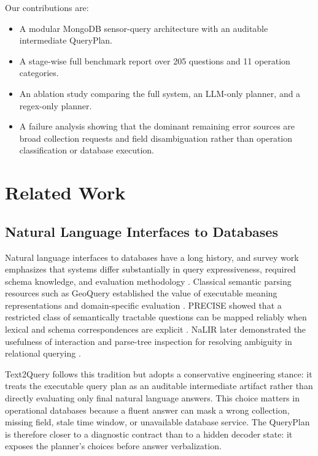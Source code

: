 \documentclass[11pt]{article}
\begin{document}
Our contributions are:
\begin{itemize}
\item A modular MongoDB sensor-query architecture with an auditable intermediate QueryPlan.
\item A stage-wise full benchmark report over 205 questions and 11 operation categories.
\item An ablation study comparing the full system, an LLM-only planner, and a regex-only planner.
\item A failure analysis showing that the dominant remaining error sources are broad collection requests and field disambiguation rather than operation classification or database execution.
\end{itemize}

\section{Related Work}

\subsection{Natural Language Interfaces to Databases}

Natural language interfaces to databases have a long history, and survey work emphasizes that systems differ substantially in query expressiveness, required schema knowledge, and evaluation methodology \cite{androutsopoulos1995nlidb,affolter2019survey}. Classical semantic parsing resources such as GeoQuery established the value of executable meaning representations and domain-specific evaluation \cite{zelle1996geoquery}. PRECISE showed that a restricted class of semantically tractable questions can be mapped reliably when lexical and schema correspondences are explicit \cite{popescu2003precise}. NaLIR later demonstrated the usefulness of interaction and parse-tree inspection for resolving ambiguity in relational querying \cite{li2015nalir}.

Text2Query follows this tradition but adopts a conservative engineering stance: it treats the executable query plan as an auditable intermediate artifact rather than directly evaluating only final natural language answers. This choice matters in operational databases because a fluent answer can mask a wrong collection, missing field, stale time window, or unavailable database service. The QueryPlan is therefore closer to a diagnostic contract than to a hidden decoder state: it exposes the planner's choices before answer verbalization.
\end{document}
